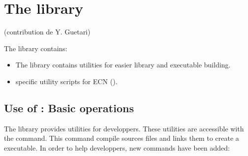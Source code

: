 \section{The library  }\label{Util}

\textnormal{(contribution de Y. Guetari)} 

The library  contains:
\begin{itemize}
\item The library  contains utilities for easier library and executable building.
\item specific utility scripts for ECN ().
\end{itemize}




\subsection{Use of  : Basic
operations}

The library  provides utilities for developpers. These
utilities are accessible with the  command. This command
  compile sources files and links them  to create a executable. In order to help developpers, new commands have been
added:

